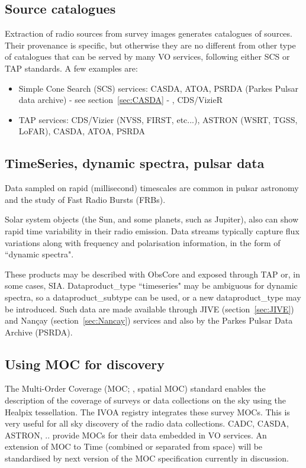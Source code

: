 \documentclass[11pt,a4paper]{ivoatex/ivoa}
\begin{document}
\subsection{Source catalogues}
Extraction of radio sources from survey images generates catalogues of sources. Their provenance is 
specific, but otherwise they are no different from other type of catalogues that can be served by many 
VO services, following either SCS \citep{std:SCS} or TAP standards. A few examples are:
\begin{itemize}
\item Simple Cone Search (SCS) services: CASDA, ATOA, PSRDA (Parkes Pulsar data archive) - see 
section~\ref{sec:CASDA} - , CDS/VizieR
\item TAP services: CDS/Vizier (NVSS, FIRST, etc...), ASTRON (WSRT, TGSS, LoFAR), CASDA, ATOA, PSRDA 
\end{itemize}


\subsection{TimeSeries, dynamic spectra, pulsar data}

Data sampled on rapid (millisecond) timescales are common in pulsar astronomy and the study of Fast 
Radio Bursts (FRBs). 

Solar system objects (the Sun, and some planets, such as Jupiter), also can show 
rapid time variability in their radio emission. Data streams typically capture flux variations along 
with frequency and polarisation information, in the form of ``dynamic spectra".

These products may be described with ObsCore and exposed through TAP or, in some cases, SIA. 
Dataproduct\_type ``timeseries" may be ambiguous for dynamic spectra, so a dataproduct\_subtype can be 
used, or a new dataproduct\_type may be introduced. Such data are made available through JIVE 
(section~\ref{sec:JIVE}) and Nan\c cay (section~\ref{sec:Nancay}) services and also by the Parkes Pulsar 
Data Archive (PSRDA).

\subsection{Using MOC for discovery}

The Multi-Order Coverage (MOC; \cite{2019ivoa.spec.1007F}, spatial MOC) standard enables the description 
of the coverage of surveys or data collections on the sky using the Healpix tessellation. The IVOA 
registry integrates these survey MOCs. This is very useful for all sky discovery of the radio data 
collections. CADC, CASDA, ASTRON, .. provide MOCs for their data embedded in VO services. An extension 
of MOC to Time (combined or separated from space) will be standardised by next version of the MOC 
specification currently in discussion.
\end{document}
